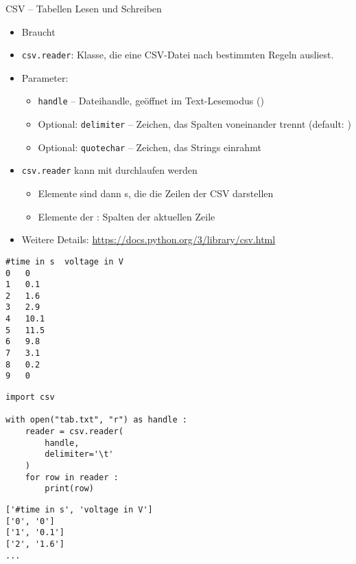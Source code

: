 \begin{frame}[fragile]{CSV -- Tabellen Lesen und Schreiben}
%
\begin{itemize}
\item Braucht 
\item \texttt{csv.reader}: Klasse, die eine CSV-Datei nach bestimmten Regeln ausliest.
\item Parameter:
	\begin{itemize}
	\item \texttt{handle} -- Dateihandle, geöffnet im Text-Lesemodus ()
	\item Optional: \texttt{delimiter} -- Zeichen, das Spalten voneinander trennt (default: )
	\item Optional: \texttt{quotechar} -- Zeichen, das Strings einrahmt
	\end{itemize}
\item \texttt{csv.reader} kann mit  durchlaufen werden
	\begin{itemize}
	\item Elemente sind dann s, die die Zeilen der CSV darstellen
	\item Elemente der : Spalten der aktuellen Zeile
	\end{itemize}
\item Weitere Details: \url{https://docs.python.org/3/library/csv.html}
\end{itemize}
%
\end{frame}


\begin{frame}[fragile]
%
\begin{tcbraster}[raster columns=2,
                  raster equal height,
                  nobeforeafter,
                  raster column skip=0.5cm]
\begin{cmdbox}
\begin{verbatim}
#time in s	voltage in V
0	0
1	0.1
2	1.6
3	2.9
4	10.1
5	11.5
6	9.8
7	3.1
8	0.2
9	0
\end{verbatim}
\end{cmdbox}
%
\begin{codebox}
\begin{verbatim}
import csv

with open("tab.txt", "r") as handle :
    reader = csv.reader(
        handle,
        delimiter='\t'
    )
    for row in reader :
        print(row)
\end{verbatim}
\end{codebox}
\end{tcbraster}
%
\begin{cmdbox}[Ausgabe]
\begin{verbatim}
['#time in s', 'voltage in V']
['0', '0']
['1', '0.1']
['2', '1.6']
...
\end{verbatim}
\end{cmdbox}
%
\end{frame}

